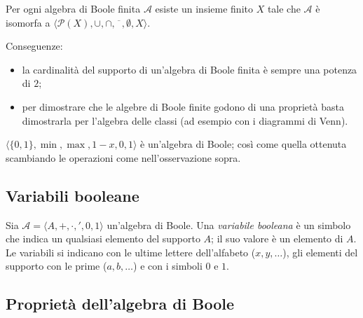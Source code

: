 \documentclass[11pt,a4paper]{article}
\begin{document}
\begin{teorema}
Per ogni algebra di Boole finita $\mathcal{A}$ esiste un insieme finito $X$ tale
che $\mathcal{A}$ è isomorfa a
$\langle \mathcal{P}(X), \cup, \cap, \overline{\phantom{x}}, \emptyset, X \rangle$.
\end{teorema}

Conseguenze:
\begin{itemize}
    \item la cardinalità del supporto di un'algebra di Boole finita è sempre una
          potenza di $2$;
    \item per dimostrare che le algebre di Boole finite godono di una proprietà
          basta dimostrarla per l'algebra delle classi (ad esempio con i
          diagrammi di Venn).
\end{itemize}

\begin{esempio}
$\langle \{0,1\}, \min, \max, 1-x, 0, 1 \rangle$ è un'algebra di Boole; così
come quella ottenuta scambiando le operazioni come nell'osservazione sopra.
\end{esempio}

\subsection{Variabili booleane}

Sia $\mathcal{A} = \langle A, +, \cdot, ', 0, 1 \rangle$ un'algebra di Boole. Una
\emph{variabile booleana} è un simbolo che indica un qualsiasi elemento del
supporto $A$; il suo valore è un elemento di $A$. Le variabili si indicano con
le ultime lettere dell'alfabeto ($x, y, \dots$), gli elementi del supporto con
le prime ($a, b, \dots$) e con i simboli $0$ e $1$.

\subsection{Proprietà dell'algebra di Boole}
\end{document}
